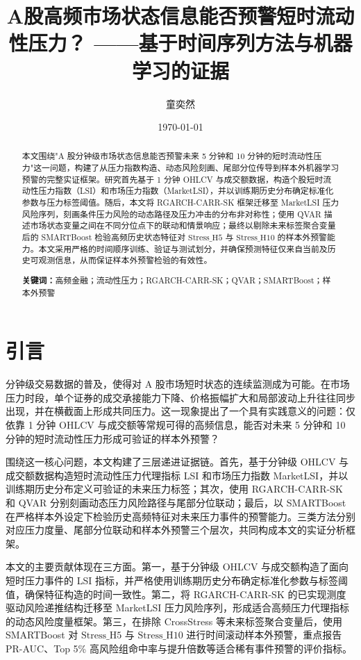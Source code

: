\documentclass[12pt,a4paper]{ctexart}
\title{A股高频市场状态信息能否预警短时流动性压力？ ——基于时间序列方法与机器学习的证据\\
\large}
\author{童奕然}
\date{\today}
\newcommand{\StressHfive}{\mathrm{Stress\_H5}}
\newcommand{\StressHten}{\mathrm{Stress\_H10}}
\begin{document}
\maketitle

\begin{abstract}
本文围绕"A 股分钟级市场状态信息能否预警未来 5 分钟和 10 分钟的短时流动性压力"这一问题，构建了从压力指数构造、动态风险刻画、尾部分位传导到样本外机器学习预警的完整实证框架。研究首先基于 1 分钟 OHLCV 与成交额数据，构造个股短时流动性压力指数（LSI）和市场压力指数（MarketLSI），并以训练期历史分布确定标准化参数与压力标签阈值。随后，本文将 RGARCH-CARR-SK 框架迁移至 MarketLSI 压力风险序列，刻画条件压力风险的动态路径及压力冲击的分布非对称性；使用 QVAR 描述市场状态变量之间在不同分位点下的联动和情景响应；最终以剔除未来标签聚合变量后的 SMARTBoost 检验高频历史状态特征对 $\StressHfive$ 与 $\StressHten$ 的样本外预警能力。本文采用严格的时间顺序训练、验证与测试划分，并确保预测特征仅来自当前及历史可观测信息，从而保证样本外预警检验的有效性。

\medskip
\noindent\textbf{关键词：}高频金融；流动性压力；RGARCH-CARR-SK；QVAR；SMARTBoost；样本外预警
\end{abstract}

\tableofcontents
\newpage

\section{引言}

分钟级交易数据的普及，使得对 A 股市场短时状态的连续监测成为可能。在市场压力时段，单个证券的成交承接能力下降、价格振幅扩大和局部波动上升往往同步出现，并在横截面上形成共同压力。这一现象提出了一个具有实践意义的问题：仅依靠 1 分钟 OHLCV 与成交额等常规可得的高频信息，能否对未来 5 分钟和 10 分钟的短时流动性压力形成可验证的样本外预警？

围绕这一核心问题，本文构建了三层递进证据链。首先，基于分钟级 OHLCV 与成交额数据构造短时流动性压力代理指标 LSI 和市场压力指数 MarketLSI，并以训练期历史分布定义可验证的未来压力标签；其次，使用 RGARCH-CARR-SK 和 QVAR 分别刻画动态压力风险路径与尾部分位联动；最后，以 SMARTBoost 在严格样本外设定下检验历史高频特征对未来压力事件的预警能力。三类方法分别对应压力度量、尾部分位联动和样本外预警三个层次，共同构成本文的实证分析框架。

本文的主要贡献体现在三方面。第一，基于分钟级 OHLCV 与成交额构造了面向短时压力事件的 LSI 指标，并严格使用训练期历史分布确定标准化参数与标签阈值，确保特征构造的时间一致性。第二，将 RGARCH-CARR-SK 的已实现测度驱动风险递推结构迁移至 MarketLSI 压力风险序列，形成适合高频压力代理指标的动态风险度量框架。第三，在排除 CrossStress 等未来标签聚合变量后，使用 SMARTBoost 对 $\StressHfive$ 与 $\StressHten$ 进行时间滚动样本外预警，重点报告 PR-AUC、Top 5\% 高风险组命中率与提升倍数等适合稀有事件预警的评价指标。
\end{document}
